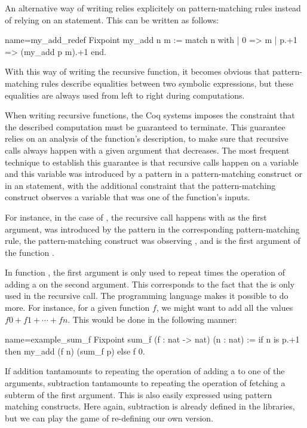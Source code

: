 An alternative way of writing  relies explicitely on
pattern-matching rules instead of relying on an  statement.
This can be written as follows:

\begin{coq}{name=my_add_redef}{}
Fixpoint my_add n m :=
  match n with
  | 0 => m
  | p.+1 => (my_add p m).+1
  end.
\end{coq}
With this way of writing the recursive function, it becomes obvious that
pattern-matching rules describe equalities between two symbolic
expressions, but these equalities are always used from left to right during
computations.

When writing recursive functions, the Coq systems imposes the
constraint that the described computation must be guaranteed to
terminate.  This guarantee relies on an analysis of the function's
description, to make sure that recursive calls always happen with a
given argument that decreases.  The most frequent technique to
establish this guarantee is that recursive calls happen on a variable
and this variable was introduced by a pattern in a pattern-matching
construct or in an  statement, with the additional constraint
that the pattern-matching construct observes a variable that was one
of the function's inputs.

For instance, in the case of , the recursive call happens
with  as the first argument,  was introduced by the pattern 
in the corresponding pattern-matching rule, the pattern-matching
construct was observing , and  is the first argument of the
function .

In function , the first argument  is only used to
repeat  times the operation of adding a  on the second
argument.  This corresponds to the fact that the  is only used in
the recursive call.  The programming language makes it possible to do
more.  For instance, for a given function \(f\), we might want to add all
the values \(f 0 + f 1 + \cdots + f n\).  This would be done in the
following manner:

\begin{coq}{name=example_sum_f}{}
Fixpoint sum_f (f : nat -> nat) (n : nat) :=
  if n is p.+1 then my_add (f n) (sum_f p) else f 0.
\end{coq}

If addition tantamounts to repeating the operation of adding a 
to one of the arguments, subtraction tantamounts to repeating the
operation of fetching a subterm of the first argument.  This is also
easily expressed using pattern matching constructs.  Here again,
subtraction is already defined in the libraries, but we can play the game
of re-defining our own version.

